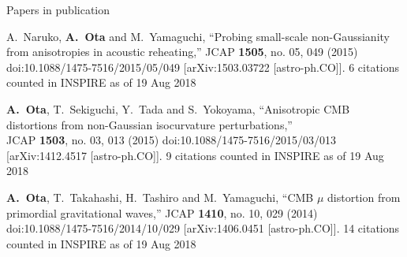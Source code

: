 \documentclass[a4paper]{resume} %
\begin{document}
\begin{rSection}{Papers in publication}
\begin{etaremune}
  \item
    A.~Naruko, {\bf A.~Ota} and M.~Yamaguchi,
  ``Probing small-scale non-Gaussianity from anisotropies in acoustic reheating,''
  JCAP {\bf 1505}, no. 05, 049 (2015)
  doi:10.1088/1475-7516/2015/05/049
  [arXiv:1503.03722 [astro-ph.CO]].
  6 citations counted in INSPIRE as of 19 Aug 2018
  
    \item
  {\bf A.~Ota}, T.~Sekiguchi, Y.~Tada and S.~Yokoyama,
  ``Anisotropic CMB distortions from non-Gaussian isocurvature perturbations,''\\
  JCAP {\bf 1503}, no. 03, 013 (2015)
  doi:10.1088/1475-7516/2015/03/013
  [arXiv:1412.4517 [astro-ph.CO]].
  9 citations counted in INSPIRE as of 19 Aug 2018
  
    \item 
      {\bf A.~Ota}, T.~Takahashi, H.~Tashiro and M.~Yamaguchi,
  ``CMB $\mu$ distortion from primordial gravitational waves,''
  JCAP {\bf 1410}, no. 10, 029 (2014)
  doi:10.1088/1475-7516/2014/10/029
  [arXiv:1406.0451 [astro-ph.CO]].
  14 citations counted in INSPIRE as of 19 Aug 2018
    
\end{etaremune}

\newpage
\end{rSection}
\end{document}

